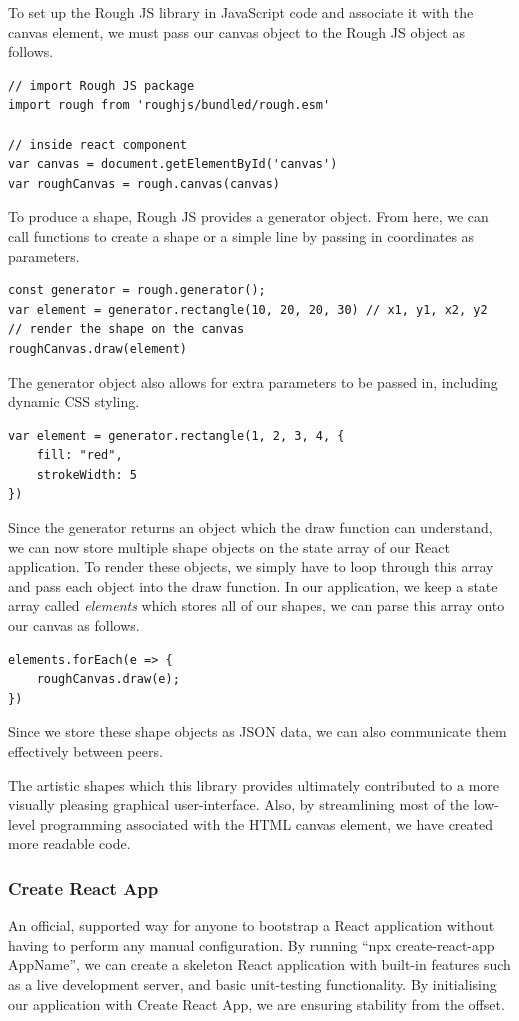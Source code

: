 To set up the Rough JS library in JavaScript code and associate it with the canvas element, we must pass our canvas object to the Rough JS object as follows. 

\begin{verbatim}
// import Rough JS package
import rough from 'roughjs/bundled/rough.esm'

// inside react component 
var canvas = document.getElementById('canvas')
var roughCanvas = rough.canvas(canvas)
\end{verbatim}
To produce a shape, Rough JS provides a generator object. From here, we can call functions to create a shape or a simple line by passing in coordinates as parameters.  

\begin{verbatim}
const generator = rough.generator();
var element = generator.rectangle(10, 20, 20, 30) // x1, y1, x2, y2
// render the shape on the canvas 
roughCanvas.draw(element)
\end{verbatim}
The generator object also allows for extra parameters to be passed in, including dynamic CSS styling.

\begin{verbatim}
var element = generator.rectangle(1, 2, 3, 4, {
    fill: "red",
    strokeWidth: 5
})
\end{verbatim}
Since the generator returns an object which the draw function can understand, we can now store multiple shape objects on the state array of our React application. To render these objects, we simply have to loop through this array and pass each object into the draw function. In our application, we keep a state array called \textit{elements} which stores all of our shapes, we can parse this array onto our canvas as follows.

\begin{verbatim}
elements.forEach(e => {
    roughCanvas.draw(e);
})
\end{verbatim}

Since we store these shape objects as JSON data, we can also communicate them effectively between peers. 

The artistic shapes which this library provides ultimately contributed to a more visually pleasing graphical user-interface. Also, by streamlining most of the low-level programming associated with the HTML canvas element, we have created more readable code. 

\subsubsection{Create React App}
An official, supported way for anyone to bootstrap a React application without having to perform any manual configuration. By running “npx create-react-app AppName”, we can create a skeleton React application with built-in features such as a live development server, and basic unit-testing functionality. By initialising our application with Create React App, we are ensuring stability from the offset.   
